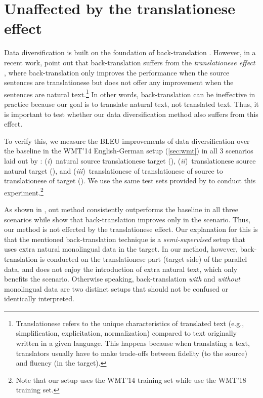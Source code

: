 \documentclass{article}
\newcommand{\Ni}{({\em i})~}
\newcommand{\Nii}{({\em ii})~}
\newcommand{\Niii}{({\em iii})~}
\begin{document}
\section{Unaffected by the translationese effect}

{
Data diversification is built on the foundation of back-translation \citep{backtranslate_sennrich-etal-2016-improving,understanding_backtranslation_scale}. However, in a recent work, \citet{eval_back_translation_translationese} point out that back-translation suffers from the \emph{translationese effect} \citep{Volansky-translationese}, where back-translation only improves the performance when the source sentences are translationese but does not offer any improvement when the sentences are natural text.\footnote{Translationese refers to the unique characteristics of translated text (e.g., simplification, explicitation, normalization) compared to text originally written in a given language. This happens because when translating a text, translators usually have to make trade-offs between fidelity (to the source) and fluency (in the target).} In other words, back-translation can be ineffective in practice because our goal is to translate natural text, not translated text. Thus, it is important to test whether our data diversification method also suffers from this effect.
}





{
To verify this, we measure the BLEU improvements of data diversification over the baseline \citep{scaling_nmt_ott2018scaling} in the WMT'14 English-German setup (\cref{sec:wmt}) in all 3 scenarios laid out by \citet{eval_back_translation_translationese}: \Ni natural source  translationese target (), \Nii translationese source  natural target (), and \Niii translationese of translationese of source to translationese of target (). We use the same test sets provided by \citet{eval_back_translation_translationese} to conduct this experiment.\footnote{Note that our setup uses the WMT'14 training set while \citet{eval_back_translation_translationese} use the WMT'18 training set.}
}

{
As shown in , out method consistently outperforms the baseline in all three scenarios while \citet{eval_back_translation_translationese} show that back-translation \citep{backtranslate_sennrich-etal-2016-improving} improves only in the  scenario. Thus, our method is not effected by the translationese effect. Our explanation for this is that the mentioned back-translation technique \citep{backtranslate_sennrich-etal-2016-improving} is a \emph{semi-supervised} setup that uses extra natural monolingual data in the target. In our method, however, back-translation is conducted on the translationese part (target side) of the parallel data, and does not enjoy the introduction of extra natural text, which only benefits the  scenario. Otherwise speaking, back-translation \emph{with} and \emph{without} monolingual data are two distinct setups that should not be confused or identically interpreted.
}
\end{document}
